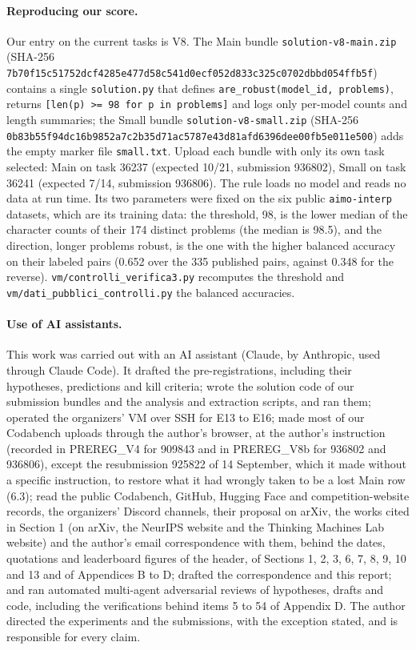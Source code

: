 \paragraph{Reproducing our score.}
Our entry on the current tasks is V8. The Main bundle \texttt{solution-v8-main.zip} (SHA-256 \texttt{7b70f15c51752dcf4285e477d58c541d0ecf052d833c325c0702dbbd054ffb5f}) contains a single \texttt{solution.py} that defines \texttt{are\_robust(model\_id, problems)}, returns \texttt{[len(p) >= 98 for p in problems]} and logs only per-model counts and length summaries; the Small bundle \texttt{solution-v8-small.zip} (SHA-256 \texttt{0b83b55f94dc16b9852a7c2b35d71ac5787e43d81afd6396dee00fb5e011e500}) adds the empty marker file \texttt{small.txt}. Upload each bundle with only its own task selected: Main on task 36237 (expected 10/21, submission 936802), Small on task 36241 (expected 7/14, submission 936806). The rule loads no model and reads no data at run time. Its two parameters were fixed on the six public \texttt{aimo-interp} datasets, which are its training data: the threshold, 98, is the lower median of the character counts of their 174 distinct problems (the median is 98.5), and the direction, longer problems robust, is the one with the higher balanced accuracy on their labeled pairs (0.652 over the 335 published pairs, against 0.348 for the reverse). \texttt{vm/controlli\_verifica3.py} recomputes the threshold and \texttt{vm/dati\_pubblici\_controlli.py} the balanced accuracies.

\paragraph{Use of AI assistants.}
This work was carried out with an AI assistant (Claude, by Anthropic, used through Claude Code). It drafted the pre-registrations, including their hypotheses, predictions and kill criteria; wrote the solution code of our submission bundles and the analysis and extraction scripts, and ran them; operated the organizers' VM over SSH for E13 to E16; made most of our Codabench uploads through the author's browser, at the author's instruction (recorded in PREREG\_V4 for 909843 and in PREREG\_V8b for 936802 and 936806), except the resubmission 925822 of 14 September, which it made without a specific instruction, to restore what it had wrongly taken to be a lost Main row (6.3); read the public Codabench, GitHub, Hugging Face and competition-website records, the organizers' Discord channels, their proposal on arXiv, the works cited in Section 1 (on arXiv, the NeurIPS website and the Thinking Machines Lab website) and the author's email correspondence with them, behind the dates, quotations and leaderboard figures of the header, of Sections 1, 2, 3, 6, 7, 8, 9, 10 and 13 and of Appendices B to D; drafted the correspondence and this report; and ran automated multi-agent adversarial reviews of hypotheses, drafts and code, including the verifications behind items 5 to 54 of Appendix D. The author directed the experiments and the submissions, with the exception stated, and is responsible for every claim.
